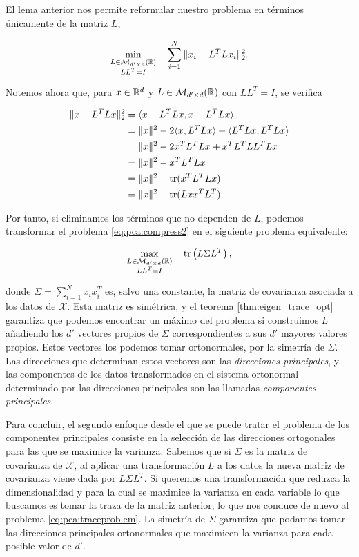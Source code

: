 \documentclass{book}
\begin{document}
El lema anterior nos permite reformular nuestro problema en términos únicamente de la matriz $L$,

\begin{equation} \label{eq:pca:compress2}
	\min_{\substack{L \in \mathcal{M}_{d'\times d}(\mathbb{R}) \\LL^T = I}} \quad \sum_{i=1}^{N} \|x_i - L^TLx_i\|_2^2.
\end{equation}

Notemos ahora que, para $x \in \mathbb{R}^d$ y $L \in \mathcal{M}_{d'\times d}(\mathbb{R})$ con $LL^T = I$, se verifica

\begin{align*}
	\|x - L^TLx\|_2^2 &= \langle x - L^TLx, x - L^TLx \rangle \\
	                  &= \|x\|^2 - 2\langle x,L^TLx \rangle + \langle L^TLx, L^TLx \rangle \\
	                  &= \|x\|^2 - 2x^TL^TLx + x^TL^TLL^TLx \\
	                  &= \|x\|^2 - x^TL^TLx \\
	                  &= \|x\|^2 - \operatorname{tr}(x^TL^TLx) \\
	                  &= \|x\|^2 - \operatorname{tr}(Lxx^TL^T).
\end{align*}

Por tanto, si eliminamos los términos que no dependen de $L$, podemos transformar el problema \ref{eq:pca:compress2} en el siguiente problema equivalente:

\begin{equation} \label{eq:pca:traceproblem}
	\max_{\substack{L \in \mathcal{M}_{d'\times d}(\mathbb{R}) \\LL^T = I}} \quad \operatorname{tr}\left(L \Sigma L^T\right),
\end{equation}

donde $\Sigma = \sum_{i=1}^N x_ix_i^T$ es, salvo una constante, la matriz de covarianza asociada a los datos de $\mathcal{X}$. Esta matriz es simétrica, y el teorema \ref{thm:eigen_trace_opt} garantiza que podemos encontrar un máximo del problema si construimos $L$ añadiendo los $d'$ vectores propios de $\Sigma$ correspondientes a sus $d'$ mayores valores propios. Estos vectores los podemos tomar ortonormales, por la simetría de $\Sigma$. Las direcciones que determinan estos vectores son las \emph{direcciones principales}, y las componentes de los datos transformados en el sistema ortonormal determinado por las direcciones principales son las llamadas \emph{componentes principales}.

Para concluir, el segundo enfoque desde el que se puede tratar el problema de los componentes principales consiste en la selección de las direcciones ortogonales para las que se maximice la varianza. Sabemos que si $\Sigma$ es la matriz de covarianza de $\mathcal{X}$, al aplicar una transformación $L$ a los datos la nueva matriz de covarianza viene dada por $L\Sigma L^T$. Si queremos una transformación que reduzca la dimensionalidad y para la cual se maximice la varianza en cada variable lo que buscamos es tomar la traza de la matriz anterior, lo que nos conduce de nuevo al problema \ref{eq:pca:traceproblem}. La simetría de $\Sigma$ garantiza que podamos tomar las direcciones principales ortonormales que maximicen la varianza para cada posible valor de $d'$.
\end{document}
